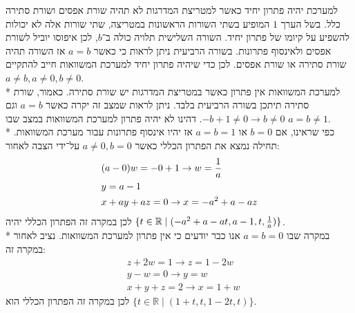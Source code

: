 \documentclass[a4paper, 10pt]{article}
\begin{document}
\begin{hebrew}
	למערכת יהיה פתרון יחיד כאשר למטריצת המדרגות לא
	תהיה שורת אפסים ושורת סתירה כלל.
	בשל הערך $1$ המופיע בשתי השורות הראשונות במטריצה,
	שתי שורות אלה לא יכולות להשפיע על קיומו של פתרון יחיד.
	השורה השלישית תלויה כולה ב־$b$,
	לכן איפוסו יוביל לשורת אפסים ולאינסוף פתרונות.
	בשורה הרביעית ניתן לראות כי כאשר $a=b$ אז השורה תהיה שורת סתירה או
	שורת אפסים. לכן כדי שיהיה פתרון יחיד למערכת המשוואות חייב להתקיים
	$a \ne b, a \ne 0, b \ne 0$. \\*
	למערכת המשוואות אין פתרון כאשר במטריצת המדרגות יש שורת סתירה.
	כאמור, שורת סתירה תיתכן בשורה הרביעית בלבד.
	ניתן לראות שמצב זה יקרה כאשר $a = b$ וגם
	$-b +1 \ne 0 \rightarrow b \ne 0$.
	דהינו לא יהיה פתרון למערכת המשוואות במצב שבו $a = b \ne 1$. \\*
	כפי שראינו, אם $b = 0$ או $a = b = 1$ אז יהיו אינסוף פתרונות
	עבור מערכת המשוואות.
	תחילה נמצא את הפתרון הכללי כאשר $a \ne 0, b = 0$ על־ידי הצבה לאחור:
	\[
		\begin{aligned}
			& (a - 0)w = -0 + 1 \rightarrow w = {1 \over a} \\
			& y = a - 1 \\
			& x + ay + az = 0 \rightarrow x = -a^2 + a - az
		\end{aligned}
	\]
	לכן במקרה זה הפתרון הכללי יהיה
	$\{ t \in \mathbb{R} \mid (-a^2 + a - at, a - 1, t, {1 \over a}) \}$. \\*
	במקרה שבו $a = b = 0$ אנו כבר יודעים כי אין פתרון למערכת המשוואות.
	נציב לאחור במקרה זה:
	\[
		\begin{aligned}
			& z + 2w = 1 \rightarrow z = 1 - 2w \\
			& y - w = 0 \rightarrow y = w \\
			& x + y + z = 2 \rightarrow x = 1 + w
		\end{aligned}
	\]
	לכן במקרה זה הפתרון הכללי הוא
	$\{ t \in \mathbb{R} \mid (1 + t, t, 1 - 2t, t) \}$.

\end{hebrew}
\end{document}
